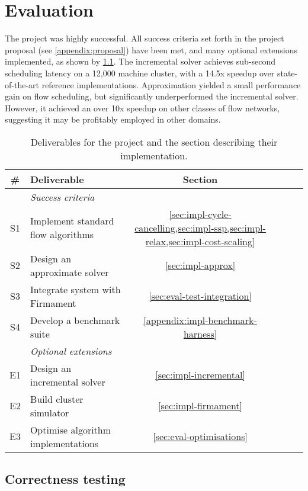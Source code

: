\chapter{Evaluation} \label{chap:eval}

The project was highly successful. All success criteria set forth in the project proposal (see \cref{appendix:proposal}) have been met, and many optional extensions implemented, as shown by \cref{table:eval-project-requirements}. The incremental solver achieves sub-second scheduling latency on a 12,000 machine cluster, with a 14.5x speedup over state-of-the-art reference implementations. Approximation yielded a small performance gain on flow scheduling, but significantly underperformed the incremental solver. However, it achieved an over 10x speedup on other classes of flow networks, suggesting it may be profitably employed in other domains.

\begin{table}
    \centering
    \begin{tabular}{clcccc}
        \textbf{\#} & \textbf{Deliverable} & \textbf{Section}
        \tabularnewline
        \hline
        & \textit{Success criteria} \tabularnewline
        S1 & Implement standard flow algorithms & \cref{sec:impl-cycle-cancelling,sec:impl-ssp,sec:impl-relax,sec:impl-cost-scaling} \tabularnewline
        S2 & Design an approximate solver & \cref{sec:impl-approx} \tabularnewline
        S3 & Integrate system with Firmament & \cref{sec:eval-test-integration} \tabularnewline
        S4 & Develop a benchmark suite & \cref{appendix:impl-benchmark-harness} \tabularnewline
        \hline
        & \textit{Optional extensions} \tabularnewline
        E1 & Design an incremental solver & \cref{sec:impl-incremental} \tabularnewline
        E2 & Build cluster simulator & \cref{sec:impl-firmament} \tabularnewline
        E3 & Optimise algorithm implementations & \cref{sec:eval-optimisations} \tabularnewline
        \hline
    \end{tabular}
    \crefsections
    \caption{Deliverables for the project and the section describing their implementation.}
    \label{table:eval-project-requirements}
\end{table}

\section{Correctness testing}

